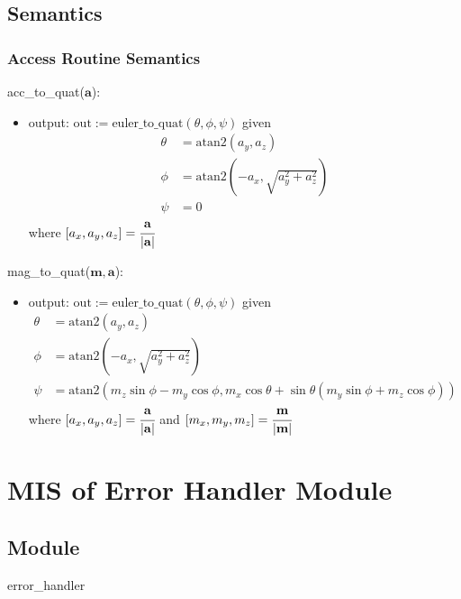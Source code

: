 \documentclass[12pt, titlepage]{article}
\begin{document}
\subsection{Semantics}

\subsubsection{Access Routine Semantics}

\noindent acc\_to\_quat($\mathbf{a}$):
\begin{itemize}
\item output: $\text{out}:= \text{euler\_to\_quat}(\theta, \phi, \psi)$ given
\begin{align*}
  \theta &= \text{atan2}(a_y, a_z) \\
  \phi &= \text{atan2}(-a_x, \sqrt{a_y^2+a_z^2}) \\
  \psi &= 0
\end{align*}
where $[a_x, a_y, a_z] = \cfrac{\mathbf{a}}{|\mathbf{a}|}$
\end{itemize}

\noindent mag\_to\_quat($\mathbf{m}, \mathbf{a}$):
\begin{itemize}
\item output: $\text{out}:= \text{euler\_to\_quat}(\theta, \phi, \psi)$ given
\begin{align*}
  \theta &= \text{atan2}(a_y, a_z) \\
  \phi &= \text{atan2}(-a_x, \sqrt{a_y^2+a_z^2}) \\
  \psi &= \text{atan2}(m_z\sin\phi - m_y\cos\phi, m_x\cos\theta + \sin\theta(m_y\sin\phi + m_z\cos\phi))
\end{align*}
where $[a_x, a_y, a_z] = \cfrac{\mathbf{a}}{|\mathbf{a}|}$ and $[m_x, m_y, m_z] =
\cfrac{\mathbf{m}}{|\mathbf{m}|}$
\end{itemize}

\newpage


\section{MIS of Error Handler Module} \label{err}

\subsection{Module}
error\_handler
\end{document}

